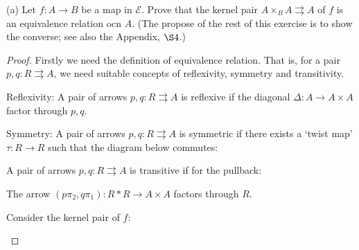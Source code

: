 \documentclass[a4paper]{article}
\DeclareMathOperator{\pr}{\sf pr}
\begin{document}
(a) Let $f:A\to B$ be a map in $\mathcal E$. Prove that the kernel pair $A\times_B A\rightrightarrows A$ of $f$ is an equivalence relation ocn $A$. (The propose of the rest of this exercise is to show the converse; see also the Appendix, $\S 4$.)
\begin{proof}
    Firstly we need the definition of equivalence relation. That is, for a pair $p,q:R\rightrightarrows A$, we need suitable concepts of reflexivity, symmetry and transitivity. 

    Reflexivity: A pair of arrows $p,q:R\rightrightarrows A$ is reflexive if the diagonal $\Delta:A\to A\times A$ factor through $p,q$. 

    \begin{center}
    \end{center}

    Symmetry: A pair of arrows $p,q:R\rightrightarrows A$ is symmetric if there exists a `twist map' $\tau:R\to R$ such that the diagram below commutes:

    \begin{center}
    \end{center}

    A pair of arrows $p,q:R\rightrightarrows A$ is transitive if for the pullback:

    \begin{center}
    \end{center}

    The arrow $(p\pi_2,q\pi_1):R*R\to A\times A$ factors through $R$.

    Consider the kernel pair of $f$:
    \begin{center}
    \end{center}


\end{proof}
\end{document}
